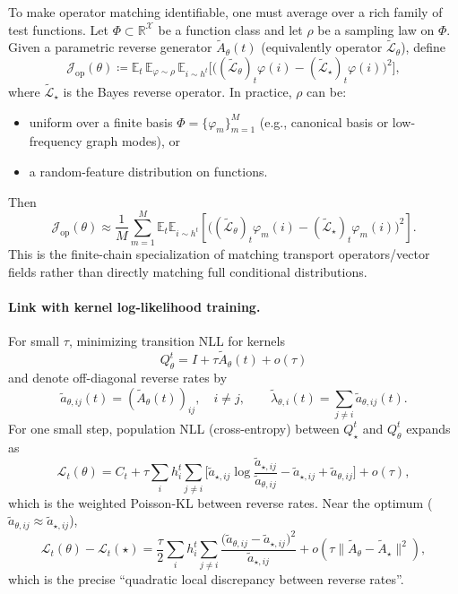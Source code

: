To make operator matching identifiable, one must average over a rich family of test functions.
Let $\Phi\subset \mathbb R^{\mathcal X}$ be a function class and let $\rho$ be a sampling law on $\Phi$.
Given a parametric reverse generator $\widetilde A_\theta(t)$ (equivalently operator $\widetilde{\mathcal L}_\theta$), define
\[
\mathcal J_{\mathrm{op}}(\theta)
\coloneqq
\mathbb E_{t}\,\mathbb E_{\varphi\sim\rho}\,\mathbb E_{i\sim h^t}\Big[
\big((\widetilde{\mathcal L}_\theta)_t\varphi(i)-(\widetilde{\mathcal L}_\star)_t\varphi(i)\big)^2
\Big],
\]
where $\widetilde{\mathcal L}_\star$ is the Bayes reverse operator.
In practice, $\rho$ can be:
\begin{itemize}
\item uniform over a finite basis $\Phi=\{\varphi_m\}_{m=1}^M$ (e.g., canonical basis or low-frequency graph modes), or
\item a random-feature distribution on functions.
\end{itemize}
Then
\[
\mathcal J_{\mathrm{op}}(\theta)\approx \frac1M\sum_{m=1}^M
\mathbb E_t\mathbb E_{i\sim h^t}\!\left[
\big((\widetilde{\mathcal L}_\theta)_t\varphi_m(i)-(\widetilde{\mathcal L}_\star)_t\varphi_m(i)\big)^2
\right].
\]
This is the finite-chain specialization of matching transport operators/vector fields rather than directly matching full conditional distributions.

\paragraph{Link with kernel log-likelihood training.}
For small $\tau$, minimizing transition NLL for kernels
\[
Q_\theta^t=I+\tau \widetilde A_\theta(t)+o(\tau)
\]
and denote off-diagonal reverse rates by
\[
\widetilde a_{\theta,ij}(t)=(\widetilde A_\theta(t))_{ij},\quad i\neq j,
\qquad
\widetilde\lambda_{\theta,i}(t)=\sum_{j\neq i}\widetilde a_{\theta,ij}(t).
\]
For one small step, population NLL (cross-entropy) between $Q_\star^t$ and $Q_\theta^t$ expands as
\[
\mathcal L_t(\theta)
=C_t
+\tau\sum_i h_i^t
\sum_{j\neq i}\Big[
\widetilde a_{\star,ij}\log\frac{\widetilde a_{\star,ij}}{\widetilde a_{\theta,ij}}
-\widetilde a_{\star,ij}
+\widetilde a_{\theta,ij}
\Big]
+o(\tau),
\]
which is the weighted Poisson-KL between reverse rates.
Near the optimum ($\widetilde a_{\theta,ij}\approx \widetilde a_{\star,ij}$),
\[
\mathcal L_t(\theta)-\mathcal L_t(\star)
=\frac{\tau}{2}\sum_i h_i^t\sum_{j\neq i}
\frac{\big(\widetilde a_{\theta,ij}-\widetilde a_{\star,ij}\big)^2}
{\widetilde a_{\star,ij}}
+o\!\left(\tau\|\widetilde A_\theta-\widetilde A_\star\|^2\right),
\]
which is the precise ``quadratic local discrepancy between reverse rates''.


